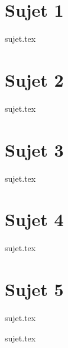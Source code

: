 \documentclass[a4paper, 11pt]{book}
\begin{document}

\chapter{Sujet 1}

\resetQ
{sujet.tex}

\chapter{Sujet 2}

\resetQ
{sujet.tex}

\chapter{Sujet 3}

\resetQ
{sujet.tex}

\chapter{Sujet 4}

\resetQ
{sujet.tex}

\chapter{Sujet 5}

\resetQ
{sujet.tex}

\resetQ
{sujet.tex}
\end{document}
